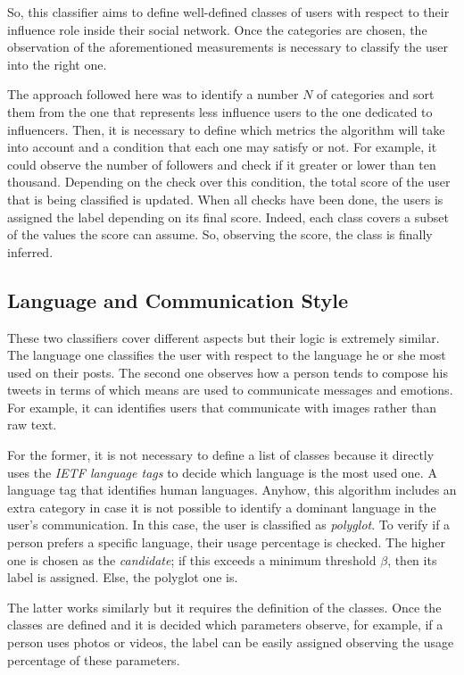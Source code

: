 So, this classifier aims to define well-defined classes of users with respect to their influence role inside their social network.
Once the categories are chosen, the observation of the aforementioned measurements is necessary to classify the user into the right one.

The approach followed here was to identify a number $N$ of categories and sort them from the one that represents less influence users to the one dedicated to influencers.
Then, it is necessary to define which metrics the algorithm will take into account and a condition that each one may satisfy or not. 
For example, it could observe the number of followers and check if it greater or lower than ten thousand.
Depending on the check over this condition, the total score of the user that is being classified is updated.
When all checks have been done, the users is assigned the label depending on its final score. Indeed, each class covers a subset of the values the score can assume.
So, observing the score, the class is finally inferred.

\subsection{Language and Communication Style}
These two classifiers cover different aspects but their logic is extremely similar.
The language one classifies the user with respect to the language he or she most used on their posts.
The second one observes how a person tends to compose his tweets in terms of which means are used to communicate messages and emotions. For example, it can identifies users that communicate with images rather than raw text.

For the former, it is not necessary to define a list of classes because it directly uses the \textit{IETF language tags} to decide which language is the most used one. A language tag that identifies human languages.
Anyhow, this algorithm includes an extra category in case it is not possible to identify a dominant language in the user's communication. In this case, the user is classified as \textit{polyglot}.
To verify if a person prefers a specific language, their usage percentage is checked. The higher one is chosen as the \textit{candidate}; if this exceeds a minimum threshold $\beta$, then its label is assigned. Else, the polyglot one is.

The latter works similarly but it requires the definition of the classes. Once the classes are defined and it is decided which parameters observe, for example, if a person uses photos or videos, the label can be easily assigned observing the usage percentage of these parameters.

